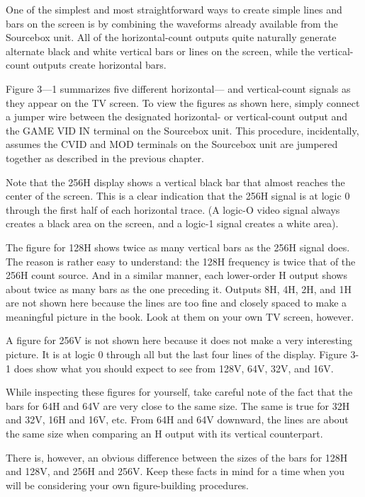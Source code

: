 \documentclass[11pt]{book}              %
\begin{document}
One of the simplest and most straightforward ways to create simple lines and bars on the screen is by combining the waveforms already available from the Sourcebox unit. All of the horizontal-count outputs quite naturally generate alternate black and white vertical bars or lines on the screen, while the vertical-count outputs create horizontal bars.

Figure 3—1 summarizes five different horizontal— and vertical-count signals as they appear on the TV screen. To view the figures as shown here, simply connect a jumper wire between the designated horizontal- or vertical-count output and the GAME VID IN terminal on the Sourcebox unit. This procedure, incidentally, assumes the CVID and MOD terminals on the Sourcebox unit are jumpered together as described in the previous chapter.

Note that the 256H display shows a vertical black bar that almost reaches the center of the screen. This is a clear indication that the 256H signal is at logic 0 through the first half of each horizontal trace. (A logic-O video signal always creates a black area on the screen, and a logic-1 signal creates a white area).

The figure for 128H shows twice as many vertical bars as the 256H signal does. The reason is rather easy to understand: the 128H frequency is twice that of the 256H count source. And in a similar manner, each lower-order H output shows about twice as many bars as the one preceding it. Outputs 8H, 4H, 2H, and 1H are not shown here because the lines are too fine and closely spaced to make a meaningful picture in the book. Look at them on your own TV screen, however.

A figure for 256V is not shown here because it does not make a very interesting picture. It is at logic 0 through all but the last four lines of the display. Figure 3-1 does show what you should expect to see from 128V, 64V, 32V, and 16V.

While inspecting these figures for yourself, take careful note of the fact that the bars for 64H and 64V are very close to the same size. The same is true for 32H and 32V, 16H and 16V, etc. From 64H and 64V downward, the lines are about the same size when comparing an H output with its vertical counterpart.

There is, however, an obvious difference between the sizes of the bars for 128H and 128V, and 256H and 256V. Keep these facts in mind for a time when you will be considering your own figure-building procedures.
\end{document}
